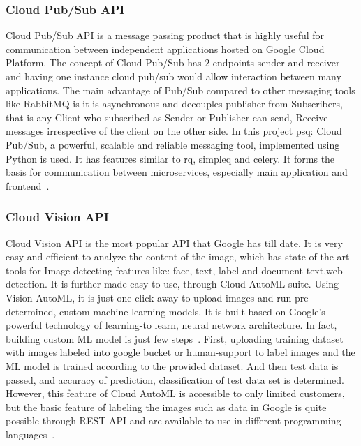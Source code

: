 \subsubsection{Cloud Pub/Sub API}

Cloud Pub/Sub API is a message passing product that is highly useful
for communication between independent applications hosted on Google
Cloud Platform. The concept of Cloud Pub/Sub has 2 endpoints sender
and receiver and having one instance cloud pub/sub would allow
interaction between many applications. The main advantage of Pub/Sub
compared to other messaging tools like RabbitMQ is it is asynchronous
and decouples publisher from Subscribers, that is any Client who
subscribed as Sender or Publisher can send, Receive messages
irrespective of the client on the other side. In this project psq:
Cloud Pub/Sub, a powerful, scalable and reliable messaging tool,
implemented using Python is used. It has features similar to rq,
simpleq and celery. It forms the basis for communication between
microservices, especially main application and
frontend~\cite{hid-sp18-602-pub-sub}.

\subsubsection{Cloud Vision API}

Cloud Vision API is the most popular API that Google has till date. It
is very easy and efficient to analyze the content of the image, which
has state-of-the art tools for Image detecting features like: face,
text, label and document text,web detection.  It is further made easy
to use, through Cloud AutoML suite. Using Vision AutoML, it is just
one click away to upload images and run pre-determined, custom machine
learning models. It is built based on Google’s powerful technology of
learning-to learn, neural network architecture. In fact, building
custom ML model is just few
steps~\cite{hid-sp18-602-cloud-automl}. First, uploading training
dataset with images labeled into google bucket or human-support to
label images and the ML model is trained according to the provided
dataset. And then test data is passed, and accuracy of prediction,
classification of test data set is determined. However, this feature
of Cloud AutoML is accessible to only limited customers, but the basic
feature of labeling the images such as data in Google is quite
possible through REST API and are available to use in different
programming languages~\cite{hid-sp18-602-cloud-vision}.


